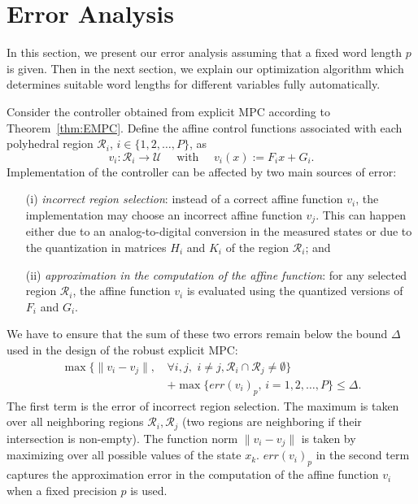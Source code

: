 \section{Error Analysis}
\label{sec:Error_Analysis}

In this section, we present our error analysis assuming that a fixed word length $p$ is given.
Then in the next section, we explain our optimization algorithm which determines suitable word
lengths for different variables fully automatically. %
%

Consider the controller obtained from explicit MPC according to Theorem~\ref{thm:EMPC}.
Define the affine control functions associated with each polyhedral region $\mathcal R_i$, $i\in\{1,2,\ldots, P\}$, as
$$v_{i}:\mathcal R_i\rightarrow \mathcal U \quad \text{ with } \quad v_{i}(x) := F_i x + G_i.$$
Implementation of the controller can be affected by two main sources of
error:
\begin{itemize}
  \item[(i)] \emph{incorrect region selection}:
   instead of a correct affine function $v_{i}$, the implementation may choose an incorrect affine function $v_{j}$. This can happen either
    due to an analog-to-digital conversion in the measured states or due to the quantization in matrices $H_i$ and $K_i$ of the region $\mathcal R_i$; and
    
  \item[(ii)] \emph{approximation in the computation of the affine function}: for any selected region $\mathcal R_i$, the affine function $v_{i}$ is evaluated using the quantized versions of $F_i$ and $G_i$.
\end{itemize}

We have to ensure that the sum of these two errors remain below the bound $\Delta$
used in the design of the robust explicit MPC:
\begin{align}
  \max\{\|v_{i}-v_{j}\|,\,&\forall i,j,\,\, i\neq j, \mathcal{R}_{i}\cap\mathcal{R}_{j}\neq\emptyset\} \nonumber\\
  &+  \max\{err(v_{i})_{p},\, i=1,2,\ldots,P\} \le \Delta.
  \label{eq:delta}
\end{align}
The first term is the error of incorrect region selection. The maximum is taken over all neighboring regions 
$\mathcal R_i,\mathcal R_j$ (two regions are neighboring if their intersection is non-empty).
The function norm $\|v_{i}-v_{j}\|$ is taken by maximizing over all possible values of the state $x_k$. 
$err(v_{i})_{p}$ in
the second term captures the approximation error in the computation of the affine function $v_{i}$ when a fixed precision $p$ is used.

